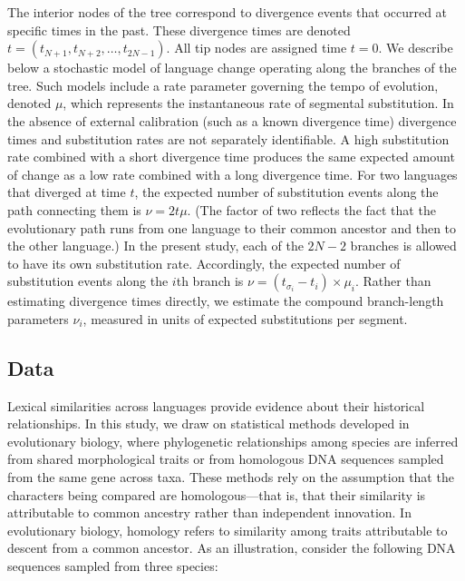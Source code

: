 \documentclass[numsec,webpdf,modern,large,namedate]{oup-authoring-template}
\begin{document}
The interior nodes of the tree correspond to divergence events that occurred at specific times in the past. These divergence times are denoted $\mathbf{\textit{t}}= (\textit{t}_{\textit{N}+ 1}, \textit{t}_{\textit{N}+ 2}, \ldots , \textit{t}_{2\textit{N}- 1})$. All tip nodes are assigned time $\textit{t}= 0$. We describe below a stochastic model of language change operating along the branches of the tree. Such models include a rate parameter governing the tempo of evolution, denoted $\mu $, which represents the instantaneous rate of segmental substitution. In the absence of external calibration (such as a known divergence time) divergence times and substitution rates are not separately identifiable. A high substitution rate combined with a short divergence time produces the same expected amount of change as a low rate combined with a long divergence time. For two languages that diverged at time $\textit{t}$, the expected number of substitution events along the path connecting them is $\nu = 2\textit{t}\mu $. (The factor of two reflects the fact that the evolutionary path runs from one language to their common ancestor and then to the other language.) In the present study, each of the $2\textit{N}- 2$ branches is allowed to have its own substitution rate. Accordingly, the expected number of substitution events along the $i$th branch is $\nu = (\textit{t}_{\sigma _i}- \textit{t}_i)\times \mu _i$. Rather than estimating divergence times directly, we estimate the compound branch-length parameters $\nu _i$, measured in units of expected substitutions per segment. 

\subsection{Data}
\label{PaperSections_PhylogenyData}
Lexical similarities across languages provide evidence about their historical relationships. In this study, we draw on statistical methods developed in evolutionary biology, where phylogenetic relationships among species are inferred from shared morphological traits or from homologous DNA sequences sampled from the same gene across taxa. These methods rely on the assumption that the characters being compared are homologous---that is, that their similarity is attributable to common ancestry rather than independent innovation. In evolutionary biology, homology refers to similarity among traits attributable to descent from a common ancestor. As an illustration, consider the following DNA sequences sampled from three species:
\end{document}
